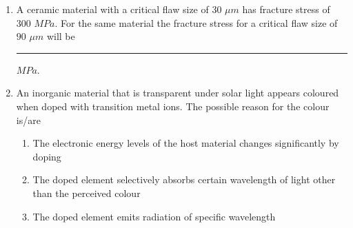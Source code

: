 \documentclass[journal,12pt,onecolumn]{IEEEtran}
\theoremstyle{remark}
\begin{document}
\begin{enumerate}
\hfill{}

\item A ceramic material with a critical flaw size of $30$ $\mu m$ has fracture stress of $300$ $MPa$. For the same material the fracture stress for a critical flaw size of $90$ $\mu m$ will be \rule{2.5cm}{0.4pt}$MPa$.

\hfill{}

\item An inorganic material that is transparent under solar light appears coloured when doped with transition metal ions. The possible reason for the colour is/are	

\begin{enumerate}[label=(\roman*)]
    \item The electronic energy levels of the host material changes significantly by doping
    \item The doped element selectively absorbs certain wavelength of light other than the perceived colour
    \item The doped element emits radiation of specific wavelength
\end{enumerate}

\hfill{}
\begin{enumerate}
\end{enumerate}

\end{enumerate}
\end{document}
